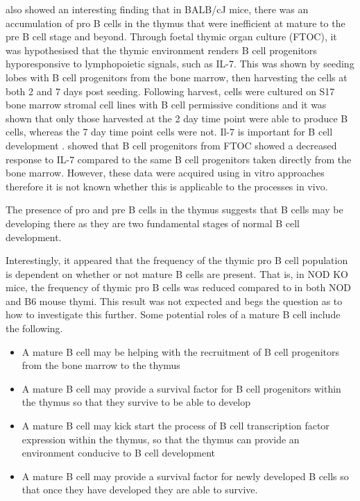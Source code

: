\citet{Hashimoto2002} also showed an interesting finding that in BALB/cJ mice, there was an accumulation of pro B cells in the thymus that were inefficient at mature to the pre B cell stage and beyond.
Through foetal thymic organ culture (FTOC), it was hypothesised that the thymic environment renders B cell progenitors hyporesponsive to lymphopoietic signals, such as IL-7.
This was shown by seeding lobes with B cell progenitors from the bone marrow, then harvesting the cells at both 2 and 7 days post seeding.
Following harvest, cells were cultured on S17 bone marrow stromal cell lines with B cell permissive conditions and it was shown that only those harvested at the 2 day time point were able to produce B cells, whereas the 7 day time point cells were not.
Il-7 is important for B cell development \citep{Corfe2012}. \citet{Hashimoto2002} showed that B cell progenitors from FTOC showed a decreased response to IL-7 compared to the same B cell progenitors taken directly from the bone marrow.
However, these data were acquired using in vitro approaches therefore it is not known whether this is applicable to the processes in vivo.

The presence of pro and pre B cells in the thymus suggests that B cells may be developing there as they are two fundamental stages of normal B cell development.

Interestingly, it appeared that the frequency of the thymic pro B cell population is dependent on whether or not mature B cells are present.
That is, in NOD KO mice, the frequency of thymic pro B cells was reduced compared to in both NOD and B6 mouse thymi.
This result was not expected and begs the question as to how to investigate this further.
Some potential roles of a mature B cell include the following.
\begin{itemize}
\item A mature B cell may be helping with the recruitment of B cell progenitors from the bone marrow to the thymus
\item A mature B cell may provide a survival factor for B cell progenitors within the thymus so that they survive to be able to develop
\item A mature B cell may kick start the process of B cell transcription factor expression within the thymus, so that the thymus can provide an environment conducive to B cell development
\item A mature B cell may provide a survival factor for newly developed B cells so that once they have developed they are able to survive.
\end{itemize}

